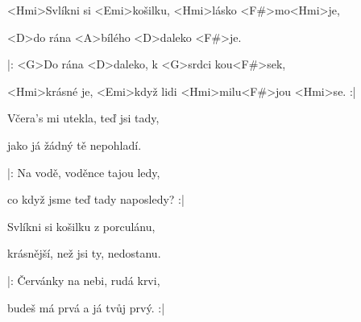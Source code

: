 

\zs
<Hmi>Svlíkni si <Emi>košilku, <Hmi>lásko <F#>mo<Hmi>je,

<D>do rána <A>bílého <D>daleko <F#>je.

|: <G>Do rána <D>daleko, k <G\dim>srdci kou<F#>sek,

<Hmi>krásné je, <Emi>když lidi <Hmi>milu<F#>jou <Hmi>se. :|
\ks

\zs
Včera's mi utekla, teď jsi tady,

jako já žádný tě nepohladí.

|: Na vodě, voděnce tajou ledy,

co když jsme teď tady naposledy? :|
\ks

\zs
Svlíkni si košilku z porculánu,

krásnější, než jsi ty, nedostanu.

|: Červánky na nebi, rudá krvi,

budeš má prvá a já tvůj prvý. :|
\ks

\kp
